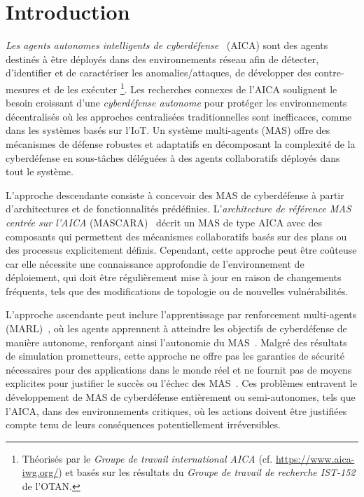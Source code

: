 



\section{Introduction}
\label{sec:introduction}

\textit{Les agents autonomes intelligents de cyberdéfense}~\cite{Kott2023} (AICA) sont des agents destinés à être déployés dans des environnements réseau afin de détecter, d'identifier et de caractériser les anomalies/attaques, de développer des contre-mesures et de les exécuter
%
\footnote{
  Théorisés par le \textit{Groupe de travail international AICA} (cf. \url{https://www.aica-iwg.org/}) et basés sur les résultats du \textit{Groupe de travail de recherche IST-152} de l'OTAN.
}.
Les recherches connexes de l'AICA soulignent le besoin croissant d'une \textit{cyberdéfense autonome} pour protéger les environnements décentralisés où les approches centralisées traditionnelles sont inefficaces, comme dans les systèmes basés sur l'IoT. Un système multi-agents (MAS) offre des mécanismes de défense robustes et adaptatifs en décomposant la complexité de la cyberdéfense en sous-tâches déléguées à des agents collaboratifs déployés dans tout le système.

L'approche descendante consiste à concevoir des MAS de cyberdéfense à partir d'architectures et de fonctionnalités prédéfinies. L'\textit{architecture de référence MAS centrée sur l'AICA} (MASCARA)~\cite{Kott2023} décrit un MAS de type AICA avec des composants qui permettent des mécanismes collaboratifs basés sur des plans ou des processus explicitement définis. Cependant, cette approche peut être coûteuse car elle nécessite une connaissance approfondie de l'environnement de déploiement, qui doit être régulièrement mise à jour en raison de changements fréquents, tels que des modifications de topologie ou de nouvelles vulnérabilités.

L'approche ascendante peut inclure l'apprentissage par renforcement multi-agents (MARL)~\cite{Albrecht2024}, où les agents apprennent à atteindre les objectifs de cyberdéfense de manière autonome, renforçant ainsi l'autonomie du MAS~\cite{hammar_stadle4_noms_23}. Malgré des résultats de simulation prometteurs, cette approche ne offre pas les garanties de sécurité nécessaires pour des applications dans le monde réel et ne fournit pas de moyens explicites pour justifier le succès ou l'échec des MAS~\cite{dulacarnold2019}. Ces problèmes entravent le développement de MAS de cyberdéfense entièrement ou semi-autonomes, tels que l'AICA, dans des environnements critiques, où les actions doivent être justifiées compte tenu de leurs conséquences potentiellement irréversibles.

